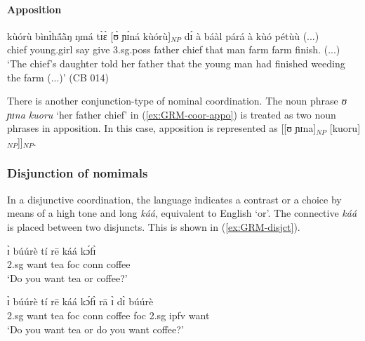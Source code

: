 \begin{exe}
\begin{exe}
\begin{exe}
{\begin{exe}
\begin{exe}
\begin{exe}
\begin{exe}
\begin{exe}
\begin{exe}
\begin{exe}
\begin{xlist}
\begin{exe}
\begin{exe}
\begin{exe}
\begin{exe}
\begin{exe}
\begin{exe}
\begin{exe}
\begin{exe}
\begin{exe}
\begin{exe}
\begin{exe}
\paragraph{Apposition}
\label{sec:GRM-np-apposition}


\begin{exe}
 \ex\label{ex:GRM-coor-appo} 
 
 \gll kùórù bìnɪ̀hã́ã̀ŋ ŋmá tɪ̀ɛ̀ [ʊ̀ ɲɪ́ná kùórù]$_{NP}$ dɪ́ à
báàl párá   à kùó pétùù  (...)\\
chief young.girl say  give {\sc 3.sg.poss} father   chief that 
{\art} man    farm {\art}    farm   finish.{\foc}  (...)  \\

 \glt  `The chief's daughter told her father that the young
man had finished weeding the farm (...)' (CB 014)
\z


There is another conjunction-type of nominal coordination. The noun phrase {\it 
ʊ ɲɪna kuoru} `her father chief'  in (\ref{ex:GRM-coor-appo}) is treated as two
noun phrases in apposition. In this case, apposition is represented as [[ʊ
ɲɪna]$_{NP}$ [kuoru]$_{NP}$]]$_{NP}$.


\subsubsection{Disjunction of nomimals}
\label{sec:GRM-disjunct-nom}

In a disjunctive coordination, the language indicates a
contrast or a choice by means of a high tone and long {\it káá},    equivalent
to 
English `or'. 
The connective {\it káá}  is  placed between  two disjuncts. This is
shown in (\ref{ex:GRM-disjct}).

\ea\label{ex:GRM-disjct}
\ea\label{ex:GRM-disjct-1}

\gll ɪ̀ búúrè tí rē káá kɔ́fɪ̀\\
        {\sc 2.sg} want tea {\sc foc} {\sc conn} coffee\\
\glt  `Do you want tea or coffee?' 

\ex\label{ex:GRM-disjct-2}

\gll ɪ̀ búúrè tí rē káá kɔ́fɪ̀ rā ɪ̀ dɪ̀ búúrè\\
        {\sc 2.sg} want tea {\sc foc} {\sc conn} coffee {\sc foc} {\sc 2.sg}
{\sc ipfv} want \\
\glt  `Do you want tea or do you want coffee?' 

\z 
 \z




\end{exe}
\end{exe}
\end{exe}
\end{exe}
\end{exe}
\end{exe}
\end{exe}
\end{exe}
\end{exe}
\end{exe}
\end{exe}
\end{exe}
\end{xlist}
\end{exe}
\end{exe}
\end{exe}
\end{exe}
\end{exe}
\end{exe}
\end{exe}}
\end{exe}
\end{exe}
\end{exe}
